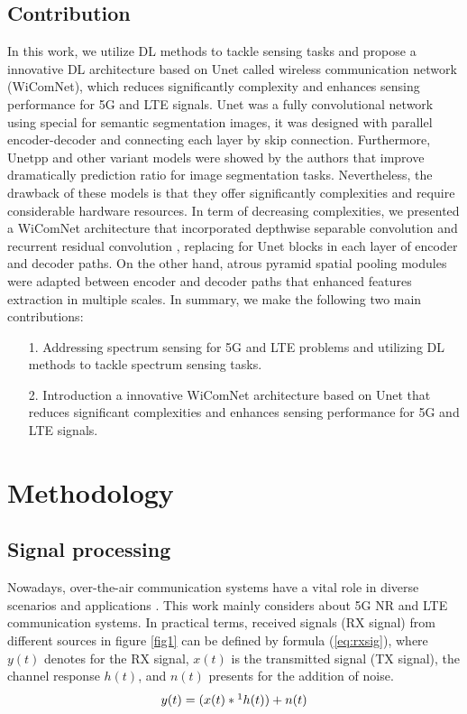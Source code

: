 \documentclass[journal]{IEEEtran} %
\begin{document}
\subsection{Contribution}
In this work, we utilize DL methods to tackle sensing tasks and propose a innovative DL architecture based on Unet called wireless communication network (WiComNet), which reduces significantly complexity and enhances sensing performance for 5G and LTE signals. Unet was a fully convolutional network \cite{ronneberger2015u} using special for semantic segmentation images, it was designed with parallel encoder-decoder and connecting each layer by skip connection. Furthermore, Unetpp and other variant models were showed by the authors \cite{zhou2019unet++} that improve dramatically prediction ratio for image segmentation tasks. Nevertheless, the drawback of these models is that they offer significantly complexities and require considerable hardware resources. In term of decreasing complexities, we presented a WiComNet architecture that incorporated depthwise separable convolution \cite{CholletXception} and recurrent residual convolution \cite{AlomNuclei} \cite{he2016deep} \cite{aghalari2021brain}, replacing for Unet blocks in each layer of encoder and decoder paths. On the other hand, atrous pyramid spatial pooling modules \cite{ChenAtrous} were adapted between encoder and decoder paths that enhanced features extraction in multiple scales. In summary, we make the following two main contributions:
\begin{itemize}
\item[1.] Addressing spectrum sensing for 5G and LTE problems and utilizing DL methods to tackle spectrum sensing tasks.
\item[2.] Introduction a innovative WiComNet architecture based on Unet that reduces significant complexities and enhances sensing performance for 5G and LTE signals.
\end{itemize}



\section{Methodology}


\subsection{Signal processing}
Nowadays, over-the-air communication systems have a vital role in diverse scenarios and applications \cite{lin20215g}. This work mainly considers about 5G NR and LTE communication systems. In practical terms, received signals (RX signal) from different sources in figure \ref{fig1} can be defined by formula (\ref{eq:rxsig}), where \( y(t) \) denotes for the RX signal, \( x(t) \) is the transmitted signal (TX signal), the channel response \(h(t)\), and \(n(t)\) presents for the addition of noise. 
\begin{equation}
    y(t) = (x(t) *\footnote{\label{Convop}*: denotes for convolution operation} h(t)) + n(t)
    \label{eq:rxsig}
\end{equation}
\end{document}
